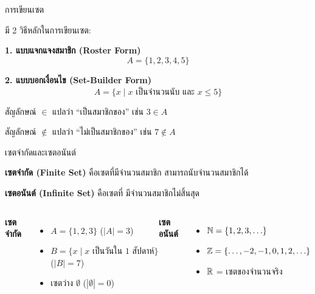 \documentclass[11pt, aspectratio=169]{beamer}
\begin{document}
\begin{frame}{การเขียนเซต}
  \begin{explanation}[วิธีเขียนเซต]
    มี 2 วิธีหลักในการเขียนเซต:

    \medskip
    \textbf{1. แบบแจกแจงสมาชิก (Roster Form)}
    \[
      A = \{1, 2, 3, 4, 5\}
    \]

    \textbf{2. แบบบอกเงื่อนไข (Set-Builder Form)}
    \[
      A = \{x \mid x \text{ เป็นจำนวนนับ และ } x \leq 5\}
    \]

    \medskip
    สัญลักษณ์ $\in$ แปลว่า ``เป็นสมาชิกของ'' \quad เช่น $3 \in A$
    \par สัญลักษณ์ $\notin$ แปลว่า ``ไม่เป็นสมาชิกของ'' \quad เช่น $7 \notin A$
  \end{explanation}
\end{frame}

\begin{frame}{เซตจำกัดและเซตอนันต์}
  \begin{explanation}[นิยาม]
    \textbf{เซตจำกัด (Finite Set)} คือเซตที่มีจำนวนสมาชิก 
    สามารถนับจำนวนสมาชิกได้

    \medskip
    \textbf{เซตอนันต์ (Infinite Set)} คือเซตที่ 
    มีจำนวนสมาชิกไม่สิ้นสุด
  \end{explanation}

  \begin{columns}[T]
      \textbf{เซตจำกัด}
      \begin{itemize}
        \item $A = \{1, 2, 3\}$ \quad ($|A| = 3$)
        \item $B = \{x \mid x \text{ เป็นวันใน 1 สัปดาห์}\}$ \quad ($|B| = 7$)
        \item เซตว่าง $\emptyset$ \quad ($|\emptyset| = 0$)
      \end{itemize}

      \textbf{เซตอนันต์}
      \begin{itemize}
        \item $\mathbb{N} = \{1, 2, 3, \ldots\}$
        \item $\mathbb{Z} = \{\ldots, -2, -1, 0, 1, 2, \ldots\}$
        \item $\mathbb{R}$ = เซตของจำนวนจริง
      \end{itemize}
  \end{columns}
\end{frame}
\end{document}
